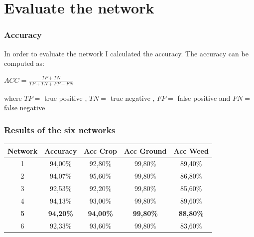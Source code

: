 \documentclass{beamer}
\begin{document}

\section{Evaluate the network}



\begin{frame}
\frametitle{Accuracy}

In order to evaluate the network I calculated the accuracy. The accuracy can be computed as:

\begin{center}

	$ ACC= \frac{TP+TN}{TP+TN+FP+FN} $

\end{center}

where $ TP = $ true positive , $ TN =$ true negative , $ FP =$ false positive  and $ FN =$ false negative 

\end{frame}


\begin{frame}
\frametitle{Results of the six networks}

\begin{table}
\centering

\begin{tabular}{|c|c|c|c|c|}
 \hline
 \textbf{Network} & \textbf{Accuracy} & \textbf{Acc Crop} & \textbf{Acc Ground} & \textbf{Acc Weed} \\ \hline
 1 & 94,00\% & 92,80\%  & 99,80\%  & 89,40\%  \\ \hline
 2 & 94,07\% & 95,60\%  & 99,80\%  & 86,80\%  \\ \hline
 3 & 92,53\% & 92,20\%  & 99,80\%  & 85,60\%  \\ \hline
 4 & 94,13\% & 93,00\%  & 99,80\%  & 89,60\%  \\ \hline
 \textbf{5} & \textbf{94,20\%} & \textbf{94,00\%}  & \textbf{99,80\%}  & \textbf{88,80\%}  \\ \hline
 6 & 92,33\% & 93,60\%  & 99,80\%  & 83,60\%  \\ \hline
\end{tabular}
\end{table}

\end{frame}
\end{document}
